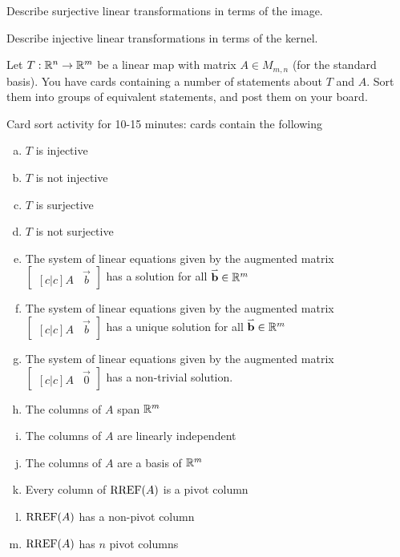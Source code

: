 
\begin{applicationActivities}{3}{19}
\begin{activity}{10}
  \begin{subactivity}
    Describe surjective linear transformations in terms of the image.
  \end{subactivity}
  \begin{subactivity}
    Describe injective linear transformations in terms of the kernel.
  \end{subactivity}
\end{activity}

\begin{activity}{15}
Let $T: \mathbb{R}^n \rightarrow \mathbb{R}^m$ be a linear map with matrix $A \in M_{m,n}$ (for the standard basis).  You have cards containing a number of statements about $T$ and $A$.  Sort them into groups of equivalent statements, and post them on your board.

\begin{TBLnote}Card sort activity for 10-15 minutes: cards contain the following
\begin{enumerate}[(a)]
\item $T$ is injective
\item $T$ is not injective
\item $T$ is surjective
\item $T$ is not surjective
\item The system of linear equations given by the augmented matrix $\begin{bmatrix}[c|c]A & \vec{b} \end{bmatrix}$ has a solution for all $\mathbf{\accentset{\rightharpoonup}{b}} \in \mathbb{R}^m$
\item The system of linear equations given by the augmented matrix $\begin{bmatrix}[c|c]A & \vec{b} \end{bmatrix}$ has a unique solution for all $\mathbf{\accentset{\rightharpoonup}{b}} \in \mathbb{R}^m$
\item The system of linear equations given by the augmented matrix $\begin{bmatrix}[c|c] A & \vec{0} \end{bmatrix}$ has a non-trivial solution.
\item The columns of $A$ span $\mathbb{R}^m$
\item The columns of $A$ are linearly independent
\item The columns of $A$ are a basis of $\mathbb{R}^m$
\item Every column of $\operatorname{RREF}(A)$ is a pivot column
\item $\operatorname{RREF}(A)$ has a non-pivot column
\item $\operatorname{RREF}(A)$ has $n$ pivot columns
\end{enumerate}
\end{TBLnote}
\end{activity}


\end{applicationActivities}
